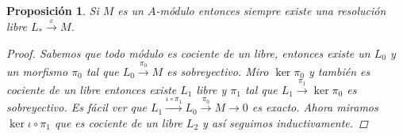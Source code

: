 \documentclass[12pt]{book}
\newtheorem{prop}[teo]{Proposición}
\theoremstyle{definition}
\begin{document}
\begin{prop}
Si $M$ es un $A$-módulo entonces siempre existe una resolución libre $L_*\stackrel{\varepsilon}{\longrightarrow} M$.
\begin{proof}

Sabemos que todo módulo es cociente de un libre, entonces existe un $L_0$ y un morfismo $\pi_0$ tal que $L_0\stackrel{\pi_0}{\longrightarrow} M$ es sobreyectivo. Miro $\ker \pi_0$ y también es cociente de un libre entonces existe $L_1$ libre y $\pi_1$ tal que $L_1\stackrel{\pi_1}{\longrightarrow} \ker \pi_0$ es sobreyectivo. Es fácil ver que $L_1 \stackrel{\iota\circ \pi_1}{\longrightarrow} L_0\stackrel{\pi_0}{\longrightarrow} M\longrightarrow 0$ es exacto. Ahora miramos $\ker\iota\circ\pi_1$ que es cociente de un libre $L_2$ y así seguimos inductivamente.

\end{proof}
\end{prop}
\end{document}

